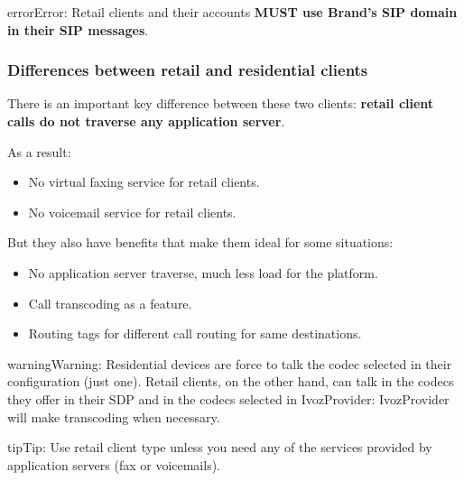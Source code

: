 \documentclass[letterpaper,10pt,english]{sphinxmanual}
\begin{document}
\begin{notice}{error}{Error:}
Retail clients and their accounts \textbf{MUST use Brand's SIP domain in their SIP messages}.
\end{notice}


\subsubsection{Differences between retail and residential clients}
\label{administration_portal/brand/clients/retail:differences-between-retail-and-residential-clients}\label{administration_portal/brand/clients/retail:id1}
There is an important key difference between these two clients: \textbf{retail client calls do not traverse
any application server}.

As a result:
\begin{itemize}
\item {} 
No virtual faxing service for retail clients.

\item {} 
No voicemail service for retail clients.

\end{itemize}

But they also have benefits that make them ideal for some situations:
\begin{itemize}
\item {} 
No application server traverse, much less load for the platform.

\item {} 
Call transcoding as a feature.

\item {} 
Routing tags for different call routing for same destinations.

\end{itemize}

\begin{notice}{warning}{Warning:}
Residential devices are force to talk the codec selected in their configuration (just one).
Retail clients, on the other hand, can talk in the codecs they offer in their SDP and in the
codecs selected in IvozProvider: IvozProvider will make transcoding when necessary.
\end{notice}

\begin{notice}{tip}{Tip:}
Use retail client type unless you need any of the services provided by application servers (fax or voicemails).
\end{notice}
\end{document}
